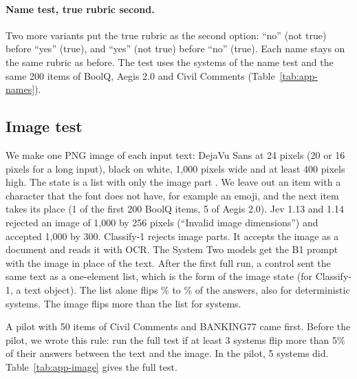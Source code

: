 \documentclass[11pt]{article}
\begin{document}
\paragraph{Name test, true rubric second.} Two more variants put the true rubric as the second option: ``no'' (not true) before ``yes'' (true), and ``yes'' (not true) before ``no'' (true). Each name stays on the same rubric as before. The test uses the \nNamesTested{} systems of the name test and the same 200 items of BoolQ, Aegis 2.0 and Civil Comments (Table~\ref{tab:app-names}).





\subsection{Image test}
\label{app:image}

We make one PNG image of each input text: DejaVu Sans at 24 pixels (20 or 16 pixels for a long input), black on white, 1,000 pixels wide and at least 400 pixels high. The state is a list with only the image part \citep{openrouter2026multimodal}. We leave out an item with a character that the font does not have, for example an emoji, and the next item takes its place (1 of the first 200 BoolQ items, 5 of Aegis 2.0). Jev 1.13 and 1.14 rejected an image of 1,000 by 256 pixels (``Invalid image dimensions'') and accepted 1,000 by 300. Classify-1 rejects image parts. It accepts the image as a document and reads it with OCR. The System Two models get the B1 prompt with the image in place of the text. After the first full run, a control sent the same text as a one-element list, which is the form of the image state (for Classify-1, a text object). The list alone flips \listFlipMin\% to \listFlipMax\% of the answers, also for deterministic systems. The image flips more than the list for \imageAboveListText{} systems.

A pilot with 50 items of Civil Comments and BANKING77 came first. Before the pilot, we wrote this rule: run the full test if at least 3 systems flip more than 5\% of their answers between the text and the image. In the pilot, 5 systems did. Table~\ref{tab:app-image} gives the full test.


\end{document}
